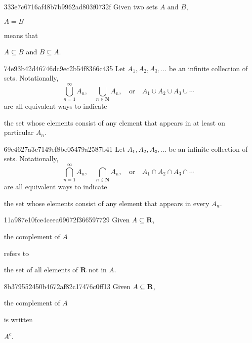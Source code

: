 \begin{note}{333e7c6716af48b7b9962ad803f0732f}
    Given two sets \({ A }\) and \({ B }\), \begin{icloze}{2}\({ A = B }\)\end{icloze} means that \begin{icloze}{1}\({ A \subseteq B }\) and \({ B \subseteq A }\).\end{icloze}
\end{note}

\begin{note}{74e93b42d46746dc9ec2b54f8366c435}
    Let \({ A_1, A_2, A_3, \ldots }\) be an infinite collection of sets.
    Notationally,
    \[
        \bigcup_{n = 1}^{\infty} A_n, \quad \bigcup_{n \in \mathbf{N}}^{} A_n, \quad \text{or} \quad A_1 \cup A_2 \cup A_3 \cup \cdots
    \]
    are all equivalent ways to indicate \begin{icloze}{1}the set whose elements consist of any element that appears in at least on particular \({ A_n }\).\end{icloze}
\end{note}

\begin{note}{69e4627a3e7149ef8be05479a2587b41}
    Let \({ A_1, A_2, A_3, \ldots }\) be an infinite collection of sets.
    Notationally,
    \[
        \bigcap_{n = 1}^{\infty} A_n, \quad \bigcap_{n \in \mathbf{N}}^{} A_n, \quad \text{or} \quad A_1 \cap A_2 \cap A_3 \cap \cdots
    \]
    are all equivalent ways to indicate \begin{icloze}{1}the set whose elements consist of any element that appears in every \({ A_n }\).\end{icloze}
\end{note}

\begin{note}{11a987e10fce4ceea69672f366597729}
    Given \({ A \subseteq \mathbf{R} }\), \begin{icloze}{2}the complement of \({ A }\)\end{icloze} refers to \begin{icloze}{1}the set of all elements of \({ \mathbf{R} }\) not in \({ A }\).\end{icloze}
\end{note}

\begin{note}{8b379552450b4672af82c17476c0ff13}
    Given \({ A \subseteq \mathbf{R} }\), \begin{icloze}{2}the complement of \({ A }\)\end{icloze} is written \begin{icloze}{1}\({ A^{c} }\).\end{icloze}
\end{note}

